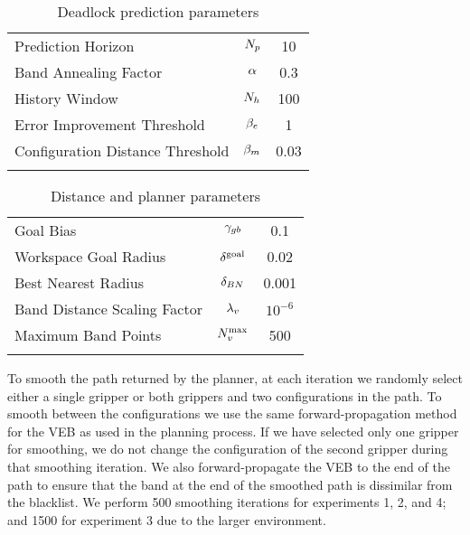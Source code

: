 \begin{table}[h]
\centering
\caption{Deadlock prediction parameters}
\label{tab:deadlock_param_table}
\begin{tabular}{lcc}
\noalign{\smallskip}\hline\noalign{\smallskip}
Prediction Horizon                  & $N_p$          &    10 \\
Band Annealing Factor               & $\alpha$        &   0.3 \\
History Window                      & $N_h$              &   100 \\
Error Improvement Threshold         & $\beta_e$     &     1 \\
Configuration Distance Threshold    & $\beta_m$    &  0.03 \\
\noalign{\smallskip}\hline
\end{tabular}
\end{table}


\begin{table}[h]
\centering
\caption{Distance and planner parameters}
\label{tab:rrt_param_table}
\begin{tabular}{lcc}
\noalign{\smallskip}\hline\noalign{\smallskip}
Goal Bias                           & $\gamma_{gb}$                   &     0.1 \\
Workspace Goal Radius               & $\delta^\textrm{goal}$               &     0.02 \\
Best Nearest Radius                 & $\delta_{BN}$               &     0.001 \\
Band Distance Scaling Factor        & $\lambda_v$              & $10^{-6}$ \\
Maximum Band Points                 & $N_v^\textrm{max}$             & 500 \\
\noalign{\smallskip}\hline
\end{tabular}
\end{table}

To smooth the path returned by the planner, at each iteration we randomly select either a single gripper or both grippers and two configurations in the path. To smooth between the configurations we use the same forward-propagation method for the VEB as used in the planning process. If we have selected only one gripper for smoothing, we do not change the configuration of the second gripper during that smoothing iteration. We also forward-propagate the VEB to the end of the path to ensure that the band at the end of the smoothed path is dissimilar from the blacklist. We perform 500 smoothing iterations for experiments 1, 2, and 4; and 1500 for experiment 3 due to the larger environment.


